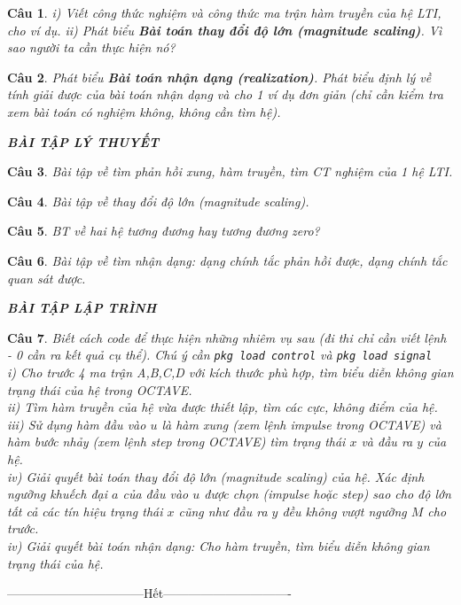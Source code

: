 \documentclass[11pt]{article}
\newtheorem{bt}{Câu}
\begin{document}
\begin{bt}
i) Viết công thức nghiệm và công thức ma trận hàm truyền của hệ LTI, cho ví dụ. 
ii) Phát biểu \textbf{Bài toán thay đổi độ lớn (magnitude scaling)}. Vì sao người ta cần thực hiện nó?
\end{bt}

\begin{bt}
Phát biểu \textbf{Bài toán nhận dạng (realization)}. Phát biểu định lý về tính giải được của bài toán nhận dạng và cho 1 ví dụ đơn giản (chỉ cần kiểm tra xem bài toán có nghiệm không, không cần tìm 
hệ).
%
\begin{center}
\textbf{BÀI TẬP LÝ THUYẾT}
\end{center}
\end{bt}

\begin{bt}
Bài tập về tìm phản hồi xung, hàm truyền, tìm CT nghiệm của 1 hệ LTI.
\end{bt}

\begin{bt}
Bài tập về thay đổi độ lớn (magnitude scaling).
\end{bt}

\begin{bt} 
BT về hai hệ tương đương hay tương đương zero?
\end{bt}

\begin{bt}
Bài tập về tìm nhận dạng: dạng chính tắc phản hồi được, dạng chính tắc quan sát được.
\begin{center}
	\textbf{BÀI TẬP LẬP TRÌNH}
\end{center}
\end{bt}

\begin{bt} Biết cách code để thực hiện những nhiêm vụ sau (đi thi chỉ cần viết lệnh - 0 cần ra kết quả cụ thể). Chú ý cần \verb|pkg load control| và \verb|pkg load signal| \\
	i) Cho trước 4 ma trận A,B,C,D với kích thước phù hợp, tìm biểu diễn không gian trạng thái của hệ trong OCTAVE. \\
	ii) Tìm hàm truyền của hệ vừa được thiết lập, tìm các cực, không điểm của hệ. \\
	iii) Sử dụng hàm đầu vào $u$ là hàm xung (xem lệnh impulse trong OCTAVE) và hàm bước nhảy (xem lệnh step trong OCTAVE) tìm trạng thái $x$ và đầu ra $y$ của hệ.  \\
	iv) Giải quyết bài toán thay đổi độ lớn (magnitude scaling) của hệ. Xác định ngưỡng khuếch đại $a$ của đầu vào $u$ được chọn (impulse hoặc step) sao cho độ lớn tất cả các tín hiệu trạng thái $x$
	cũng như đầu ra $y$ đều không vượt ngưỡng $M$ cho trước. \\
	iv) Giải quyết bài toán nhận dạng: Cho hàm truyền, tìm biểu diễn không gian trạng thái của hệ. \\	 
\end{bt}

\centerline{———————————Hết——————————-}
\end{document}

